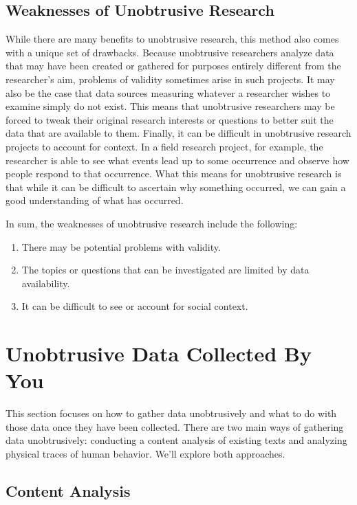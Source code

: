 \subsection{Weaknesses of Unobtrusive Research}

While there are many benefits to unobtrusive research, this method also comes with a unique set of drawbacks. Because unobtrusive researchers analyze data that may have been created or gathered for purposes entirely different from the researcher’s aim, problems of validity sometimes arise in such projects. It may also be the case that data sources measuring whatever a researcher wishes to examine simply do not exist. This means that unobtrusive researchers may be forced to tweak their original research interests or questions to better suit the data that are available to them. Finally, it can be difficult in unobtrusive research projects to account for context. In a field research project, for example, the researcher is able to see what events lead up to some occurrence and observe how people respond to that occurrence. What this means for unobtrusive research is that while it can be difficult to ascertain why something occurred, we can gain a good understanding of what has occurred.

In sum, the weaknesses of unobtrusive research include the following:

\begin{enumerate}
	\item There may be potential problems with validity.
	\item The topics or questions that can be investigated are limited by data availability.
	\item It can be difficult to see or account for social context.
\end{enumerate}


\section{Unobtrusive Data Collected By You}


This section focuses on how to gather data unobtrusively and what to do with those data once they have been collected. There are two main ways of gathering data unobtrusively: conducting a content analysis of existing texts and analyzing physical traces of human behavior. We’ll explore both approaches.

\subsection{Content Analysis}

